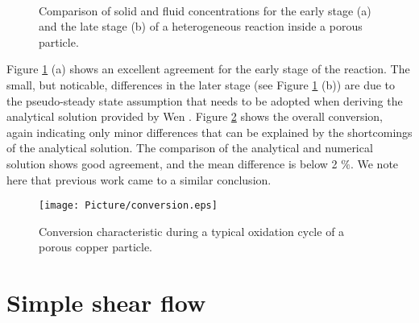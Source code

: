 \documentclass{particles2015}
\begin{document}
\begin{figure}[h!]
\centering
{}
\hspace{0.3cm}
\\
\caption{Comparison of solid and fluid concentrations for the early stage (a) and the late stage (b) of a heterogeneous reaction inside a porous particle.}
\label{fig:reaction_stages}
\end{figure}

Figure \ref{fig:reaction_stages} (a) shows an excellent agreement for the early stage of the reaction. The small, but noticable, differences in the later stage (see Figure \ref{fig:reaction_stages} (b)) are due to the pseudo-steady state assumption that needs to be adopted when deriving the analytical solution provided by Wen \cite{Wen}. Figure \ref{fig:Conversion} shows the overall conversion, again indicating only minor differences that can be explained by the shortcomings of the analytical solution. The comparison of the analytical and numerical solution shows good agreement, and the mean difference is below 2 $\%$. We note here that previous work \cite{Noorman2011} came to a similar conclusion. 

\begin{figure}[h!]
   \centering
   \texttt{[image: Picture/conversion.eps]}
   \caption{Conversion characteristic during a typical oxidation cycle of a porous copper particle.}
   \label{fig:Conversion}
\end{figure}


\newpage
\section{Simple shear flow}
\label{sec:simple_shear}
\end{document}
